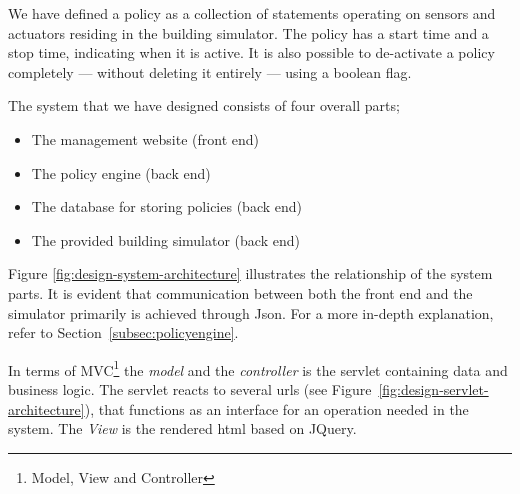 We have defined a policy as a collection of statements operating on sensors and actuators residing in the building simulator. The policy has a start time and a stop time, indicating when it is active. It is also possible to de-activate a policy completely --- without deleting it entirely --- using a boolean flag.

The system that we have designed consists of four overall parts;
\begin{itemize}
	\item The management website (front end)
	\item The policy engine (back end)
	\item The database for storing policies (back end)
	\item The provided building simulator (back end)
\end{itemize}

Figure \ref{fig:design-system-architecture} illustrates the relationship of the system parts. It is evident that communication between both the front end and the simulator primarily is achieved through Json. For a more in-depth explanation, refer to Section~\ref{subsec:policyengine}.

In terms of MVC\footnote{Model, View and Controller} the \textit{model} and the \textit{controller} is the servlet containing data and business logic. The servlet reacts to several urls (see Figure~\ref{fig:design-servlet-architecture}), that functions as an interface for an operation needed in the system. The \textit{View} is the rendered html based on JQuery.

\begin{figure}[t]
\end{figure}


